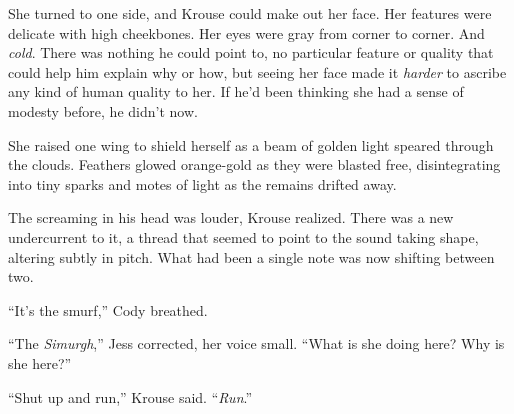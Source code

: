 She turned to one side, and Krouse could make out her face.  Her features were delicate with high cheekbones.  Her eyes were gray from corner to corner.  And \emph{cold}.  There was nothing he could point to, no particular feature or quality that could help him explain why or how, but seeing her face made it \emph{harder} to ascribe any kind of human quality to her.  If he'd been thinking she had a sense of modesty before, he didn't now.



She raised one wing to shield herself as a beam of golden light speared through the clouds.  Feathers glowed orange-gold as they were blasted free, disintegrating into tiny sparks and motes of light as the remains drifted away.



The screaming in his head was louder, Krouse realized.   There was a new undercurrent to it, a thread that seemed to point to the sound taking shape, altering subtly in pitch.  What had been a single note was now shifting between two.



``It's the smurf,'' Cody breathed.



``The \emph{Simurgh},'' Jess corrected, her voice small.  ``What is she doing here?  Why is she here?''



``Shut up and run,'' Krouse said.  ``\emph{Run}.''





